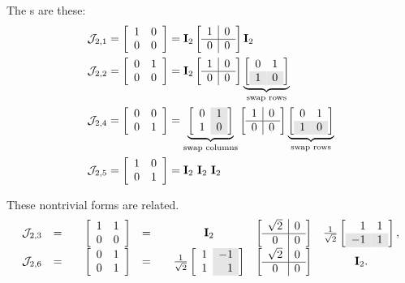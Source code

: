 The \svdl s are these:
\begin{equation}
  \begin{split}
\mathcal{J}_{2,1} &= 
\mat{cc}{ 1 & 0 \\
 0 & 0} = 
\I{2}
\mat{c|c}
{
 1 & 0 \\\hline
 0 & 0}
 \I{2}\\
\mathcal{J}_{2,2} &= 
\mat{cc}
{ 0 & 1 \\
 0 & 0} = 
\I{2}
\mat{c|c}{ 1 & 0 \\\hline
 0 & 0}
 \underbrace{\mat{cc}
 { 0 & 1 \\
\rowcolor{ltgray}
 1 & 0}}_{\text{swap rows}}\\
\mathcal{J}_{2,4} &= 
\mat{cc}
{ 0 & 0 \\
 0 & 1} = 
\underbrace{\mat{c>{\columncolor{ltgray}}c}
{ 0 & 1 \\
 1 & 0}}_{\text{swap columns}}
 \mat{c|c}
 { 1 & 0 \\\hline
 0 & 0}
 \underbrace{\mat{cc}
 { 0 & 1 \\
\rowcolor{ltgray}
 1 & 0}}_{\text{swap rows}}\\
\mathcal{J}_{2,5} &= 
\itwo
 = 
\I{2}\ 
\I{2}\ 
\I{2}
  \end{split}
\end{equation}
 
These nontrivial forms are related.
\begin{equation*}
  \begin{array}{rcccccccc}
    \mathcal{J}_{2,3} &=& 
&\mat{cc}{ 1 & 1 \\
 0 & 0} 
 &=& 
&\I{2}
&\mat{c|c}
{\sqrt{2} & 0 \\\hline
 0 & 0}
& \stwo
\mat{rr}
{ 1 & 1 \\
\rowcolor{ltgray}
 -1 & 1},\\
    \mathcal{J}_{2,6} &=& 
&\mat{cc}
{0 & 1 \\
 0 & 1} 
 &=& 
& \stwo
\mat{r>{\columncolor{ltgray}}r}
{ 1 &-1 \\
  1 & 1}
&\mat{c|c}{
 \sqrt{2} & 0 \\\hline
 0 & 0}
&\I{2}.
  \end{array}
\end{equation*}

